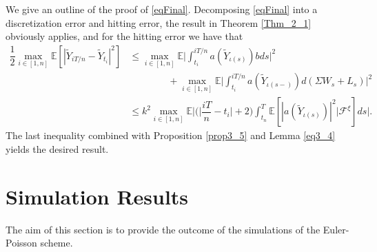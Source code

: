 We give an outline of the proof of \eqref{eqFinal}. Decomposing \eqref{eqFinal} into a discretization error and hitting error, the result in Theorem \ref{Thm_2_1} obviously applies, and for the hitting error we have that
\begin{equation}
    \begin{split}
        \dfrac{1}{2}\max_{i \in [1, n]}\mathbb{E}[|\tilde{Y}_{iT/n} - \tilde{Y}_{t_i}|^2] &\leq \max_{i \in [1, n]}\mathbb{E} \bigg|\int^{iT/n}_{t_i} a(\tilde{Y}_{\iota(s)})bds \bigg|^2\\ &\qquad\qquad+ \max_{i \in [1, n]}\mathbb{E} \bigg|\int^{iT/n}_{t_i}a(\tilde{Y}_{\iota(s-)})d(\Sigma W_s + L_s) \bigg|^2\\
        &\leq k^2 \max_{i \in [1, n]}\mathbb{E}\bigg|\big( \big|\dfrac{iT}{n} - t_i\big|+2\big) \int^{T}_{t_n} \mathbb{E}[|a(\tilde{Y}_{\iota(s)})|^2|\mathcal{F}^{\xi}]ds  \bigg|.
    \end{split}
\end{equation}
The last inequality combined with Proposition \ref{prop3_5} and Lemma \ref{eq3_4} yields the desired result.
\section{Simulation Results}
The aim of this section is to provide the outcome of the simulations of the Euler-Poisson scheme.

